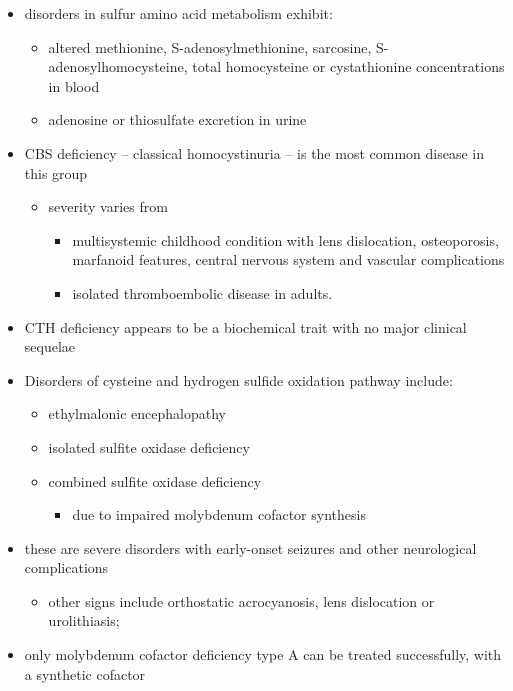 \documentclass{scrartcl}
\begin{document}
\begin{itemize}
\item disorders in sulfur amino acid metabolism exhibit:
\begin{itemize}
\item altered methionine, S-adenosylmethionine, sarcosine, S-adenosylhomocysteine,
total homocysteine or cystathionine concentrations in blood
\item adenosine or thiosulfate excretion in urine
\end{itemize}
\end{itemize}


\begin{itemize}
\item CBS deficiency – classical homocystinuria – is the most common
disease in this group
\begin{itemize}
\item severity varies from
\begin{itemize}
\item multisystemic childhood condition with lens dislocation,
osteoporosis, marfanoid features, central nervous system and
vascular complications
\item isolated thromboembolic disease in adults.
\end{itemize}
\end{itemize}
\item CTH deficiency appears to be a biochemical trait with no major
clinical sequelae
\item Disorders of cysteine and hydrogen sulfide oxidation pathway include:
\begin{itemize}
\item ethylmalonic encephalopathy
\item isolated sulfite oxidase deficiency
\item combined sulfite oxidase deficiency
\begin{itemize}
\item due to impaired molybdenum cofactor synthesis
\end{itemize}
\end{itemize}
\item these are severe disorders with early-onset seizures and other
neurological complications
\begin{itemize}
\item other signs include orthostatic acrocyanosis, lens dislocation or
urolithiasis;
\end{itemize}
\item only molybdenum cofactor deficiency type A can be treated
successfully, with a synthetic cofactor
\end{itemize}
\end{document}
